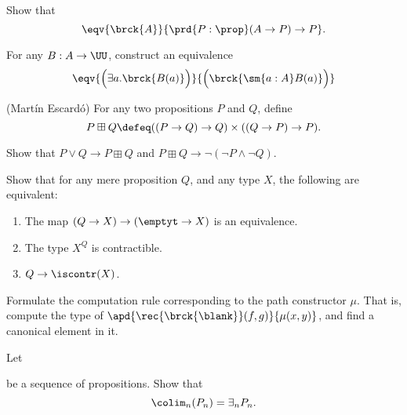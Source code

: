 \begin{exercises}
\item Show that
\begin{equation*}
\eqv{\brck{A}}{\prd{P:\prop}(A\to P)\to P}.
\end{equation*}
\item For any $B:A\to\UU$, construct an equivalence
\begin{equation*}
\eqv{\Big(\exists a.\brck{B(a)}\Big)}{\Big(\brck{\sm{a:A}B(a)}\Big)}
\end{equation*}
\item \label{also}(Mart\'in Escard\'o) For any two propositions $P$ and $Q$, define
\begin{equation*}
P\boxplus Q \defeq ((P\to Q)\to Q)\times ((Q\to P)\to P).
\end{equation*}
\begin{subexenum}
\item Show that $P\lor Q\to P\boxplus Q$ and $P\boxplus Q\to\neg(\neg P\land \neg Q)$.
\end{subexenum}
\item Show that for any mere proposition $Q$, and any type $X$, the following are equivalent:
\begin{enumerate}
\item The map $(Q\to X)\to(\emptyt\to X)$ is an equivalence.
\item The type $X^Q$ is contractible.
\item $Q\to\iscontr(X)$.
\end{enumerate}
\item \label{ex:brck_comp} Formulate the computation rule corresponding to the path constructor $\mu$. That is, compute the type of $\apd{\rec{\brck{\blank}}(f,g)}{\mu(x,y)}$, and find a canonical element in it.
\item Let
be a sequence of propositions. Show that
\begin{equation*}
\colim_n(P_n)=\exists_n P_n.
\end{equation*}
\end{exercises}

